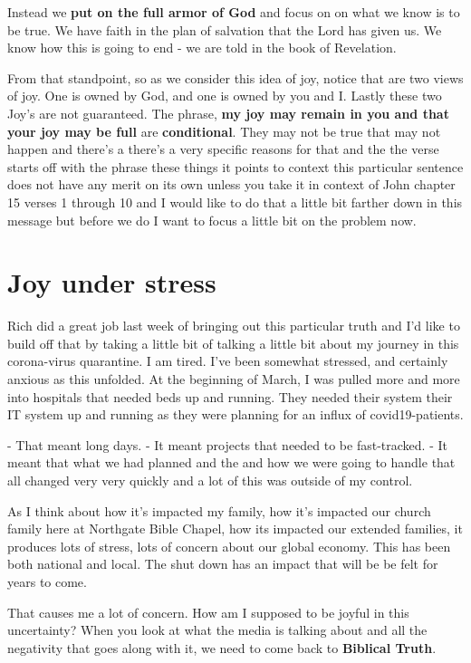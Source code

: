 \documentclass[11pt]{article} %
\begin{document}
Instead we \textbf{put on the full armor of God} and focus on on what we know is to be true. We have
faith in the plan of salvation that the Lord has given us.  We know how this is going to
end - we are told in the book of Revelation.

From that standpoint, so as we consider this idea of joy, notice that are two views of joy. One is owned
by God, and one is owned by you and I. Lastly these two Joy's are not guaranteed. The phrase,
\textbf{my joy may remain in you and that your joy may be full} are \textbf{conditional}. 
They may not be true that may not happen and there's a there's a very specific reasons for
that and the the verse starts off with the phrase these things it points to context this particular
sentence does not have any merit on its own unless you take it in context of John chapter 15
verses 1 through 10 and I would like to do that a little bit farther down in this message but
before we do I want to focus a little bit on the problem now.

\section{Joy under stress}

Rich did a great job last week of bringing out this particular truth and I'd like to build off that by
taking a little bit of talking a little bit about my journey in this corona-virus quarantine. I am tired.
I've been somewhat stressed, and certainly anxious as this unfolded.  At the beginning of March,
I was pulled more and more into hospitals that needed beds up and running. They needed their
system their IT system up and running as they were planning for an influx of covid19-patients.

- That meant long days.
- It meant projects that needed to be fast-tracked.
- It meant that what we had planned and the and how we were going to handle that all changed
very very quickly and a lot of this was outside of my control.

As I think about how it's impacted my family, how it's impacted our church family here at Northgate
Bible Chapel, how its impacted our extended families, it produces lots of stress, lots of concern
about our global economy. This has been both national and local. The shut down has an impact
that will be be felt for years to come.

That causes me a lot of concern. How am I supposed to be joyful in this uncertainty?  When you
look at what the media is talking about and all the negativity that goes along with it, we need to
come back to \textbf{Biblical Truth}.
\end{document}
